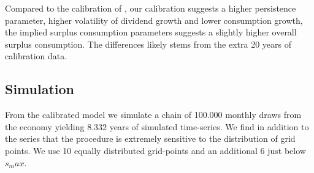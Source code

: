 Compared to the calibration of \citet{Campbell1999}, our calibration suggests a higher persistence parameter, higher volatility of dividend growth and lower consumption growth, the implied surplus consumption parameters suggests a slightly higher overall surplus consumption. The differences likely stems from the extra 20 years of calibration data. \\
\subsection{Simulation}
From the calibrated model we simulate a chain of 100.000 monthly draws from the economy yielding 8.332 years of simulated time-series. We find in addition to the series that the procedure is extremely sensitive to the distribution of grid points. We use 10 equally distributed grid-points and an additional 6 just below $s_max$.


